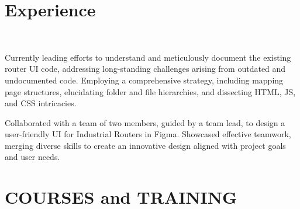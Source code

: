 \documentclass[]{deedy-resume-openfont}
\begin{document}
\begin{minipage}[t]{0.63\textwidth}


\section{Experience}

 \\


\hspace{0cm}
\vspace{\topsep} %
\begin{tightemize}

\item Currently leading efforts to understand and meticulously document the existing router UI code, addressing long-standing
challenges arising from outdated and undocumented code. Employing a comprehensive strategy, including mapping page
structures, elucidating folder and file hierarchies, and dissecting HTML, JS, and CSS intricacies.
\vspace{2pt} %
\item  Collaborated with a team of two members, guided by a team lead, to design a user-friendly UI for Industrial Routers in
Figma. Showcased effective teamwork, merging diverse skills to create an innovative design aligned with project goals
and user needs.

\end{tightemize}
\sectionsep


\section{COURSES and TRAINING}

 \\



\vspace{\topsep} %
\begin{tightemize}


\end{tightemize}
\end{minipage}
\end{document}
